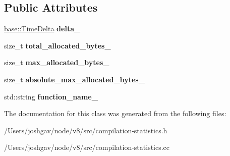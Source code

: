 \subsection*{Public Attributes}
\begin{DoxyCompactItemize}
\item 
\hyperlink{classv8_1_1base_1_1_time_delta}{base\+::\+Time\+Delta} {\bfseries delta\+\_\+}\hypertarget{classv8_1_1internal_1_1_compilation_statistics_1_1_basic_stats_a927df9d6f97d65c3a2aedad57e818c94}{}\label{classv8_1_1internal_1_1_compilation_statistics_1_1_basic_stats_a927df9d6f97d65c3a2aedad57e818c94}

\item 
size\+\_\+t {\bfseries total\+\_\+allocated\+\_\+bytes\+\_\+}\hypertarget{classv8_1_1internal_1_1_compilation_statistics_1_1_basic_stats_a442ab48eb38a620c9254ed9754560909}{}\label{classv8_1_1internal_1_1_compilation_statistics_1_1_basic_stats_a442ab48eb38a620c9254ed9754560909}

\item 
size\+\_\+t {\bfseries max\+\_\+allocated\+\_\+bytes\+\_\+}\hypertarget{classv8_1_1internal_1_1_compilation_statistics_1_1_basic_stats_ab0a41a6a47d3f12549fba351d714e546}{}\label{classv8_1_1internal_1_1_compilation_statistics_1_1_basic_stats_ab0a41a6a47d3f12549fba351d714e546}

\item 
size\+\_\+t {\bfseries absolute\+\_\+max\+\_\+allocated\+\_\+bytes\+\_\+}\hypertarget{classv8_1_1internal_1_1_compilation_statistics_1_1_basic_stats_a29cc261980ab93281332774e1b98f361}{}\label{classv8_1_1internal_1_1_compilation_statistics_1_1_basic_stats_a29cc261980ab93281332774e1b98f361}

\item 
std\+::string {\bfseries function\+\_\+name\+\_\+}\hypertarget{classv8_1_1internal_1_1_compilation_statistics_1_1_basic_stats_a12a3c0e593f62792c029d9ab0cce50c8}{}\label{classv8_1_1internal_1_1_compilation_statistics_1_1_basic_stats_a12a3c0e593f62792c029d9ab0cce50c8}

\end{DoxyCompactItemize}


The documentation for this class was generated from the following files\+:\begin{DoxyCompactItemize}
\item 
/\+Users/joshgav/node/v8/src/compilation-\/statistics.\+h\item 
/\+Users/joshgav/node/v8/src/compilation-\/statistics.\+cc\end{DoxyCompactItemize}
